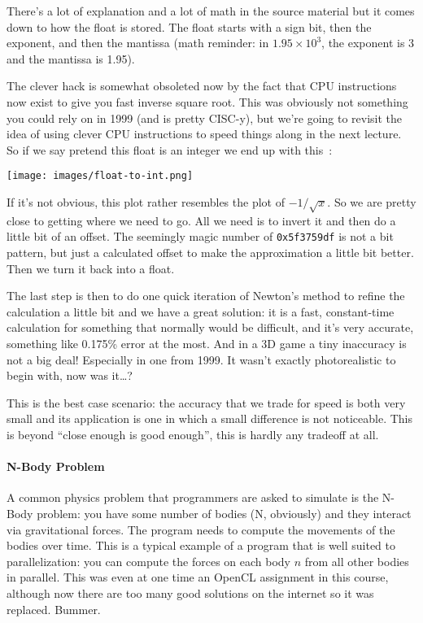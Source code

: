 There's a lot of explanation and a lot of math in the source material but it comes down to how the float is stored. The float starts with a sign bit, then the exponent, and then the mantissa (math reminder: in $1.95 \times 10^{3}$, the exponent is 3 and the mantissa is 1.95).

The clever hack is somewhat obsoleted now by the fact that CPU instructions now exist to give you fast inverse square root. This was obviously not something you could rely on in 1999 (and is pretty CISC-y), but we're going to revisit the idea of using clever CPU instructions to speed things along in the next lecture. So if we say pretend this float is an integer we end up with this~\cite{fisqrt2}:

\begin{center}
	\texttt{[image: images/float-to-int.png]}
\end{center}

If it's not obvious, this plot rather resembles the plot of $-1/\sqrt{x}$. So we are pretty close to getting where we need to go. All we need is to invert it and then do a little bit of an offset. The seemingly magic number of \texttt{0x5f3759df} is not a bit pattern, but just a calculated offset to make the approximation a little bit better. Then we turn it back into a float.

The last step is then to do one quick iteration of Newton's method to refine the calculation a little bit and we have a great solution: it is a fast, constant-time calculation for something that normally would be difficult, and it's very accurate, something like 0.175\% error at the most. And in a 3D game a tiny inaccuracy is not a big deal! Especially in one from 1999. It wasn't exactly photorealistic to begin with, now was it\ldots?

This is the best case scenario: the accuracy that we trade for speed is both very small and its application is one in which a small difference is not noticeable. This is beyond ``close enough is good enough'', this is hardly any tradeoff at all.


\paragraph{N-Body Problem}
A common physics problem that programmers are asked to simulate is the N-Body problem: you have some number of bodies (N, obviously) and they interact via gravitational forces. The program needs to compute the movements of the bodies over time. This is a typical example of a program that is well suited to parallelization: you can compute the forces on each body $n$ from all other bodies in parallel. This was even at one time an OpenCL assignment in this course, although now there are too many good solutions on the internet so it was replaced. Bummer.

